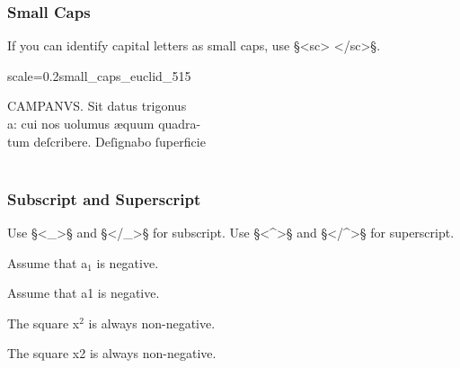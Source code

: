 \subsubsection{Small Caps}
\label{section small caps}

\begin{mainrule}
If you can identify capital letters as small caps, use §<sc> </sc>§.
\end{mainrule}

\vspace{3mm}
\begin{sampleImageSmall}{scale=0.2}{small_caps_euclid_515}

\begin{typeLatin}
CAMPANVS. Sit datus trigonus\\
a: cui nos uolumus æquum quadra-\\
tum deſcribere. Deſignabo ſuperfici\bs\tld{}e \\
\someText {} \\
\end{typeLatin}

\end{sampleImageSmall}


\subsubsection{Subscript and Superscript}
\label{section subscript and superscript}

\begin{mainrule}
Use §<_>§ and §</_>§ for subscript. Use §<^>§ and §</^>§ for superscript.
\end{mainrule}

\begin{example}[ 1: \, subscript]

\vspace{-4mm}
Assume that a$_1$ is negative.
\begin{typeLatin}
Assume that a\bold{<_>}1\bold{</_>} is negative.
\end{typeLatin}
\end{example}

\begin{example}[ 2: \, superscript]

\vspace{-4mm}
The square x$^2$ is always non-negative.
\begin{typeLatin}
The square x\bold{<^>}2\bold{</^>} is always non-negative.
\end{typeLatin}
\end{example}

